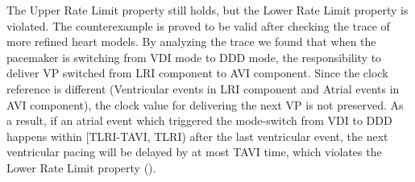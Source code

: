 The Upper Rate Limit property still holds, but the Lower Rate Limit property is violated. The counterexample is proved to be valid after checking the trace of more refined heart models. By analyzing the trace we found that when the pacemaker is switching from VDI mode to DDD mode, the responsibility to deliver VP switched from LRI component to AVI component. Since the clock reference is different (Ventricular events in LRI component and Atrial events in AVI component), the clock value for delivering the next VP is not preserved. As a result, if an atrial event which triggered the mode-switch from VDI to DDD happens within [TLRI-TAVI, TLRI) after the last ventricular event, the next ventricular pacing will be delayed by at most TAVI time, which violates the Lower Rate Limit property (). 
